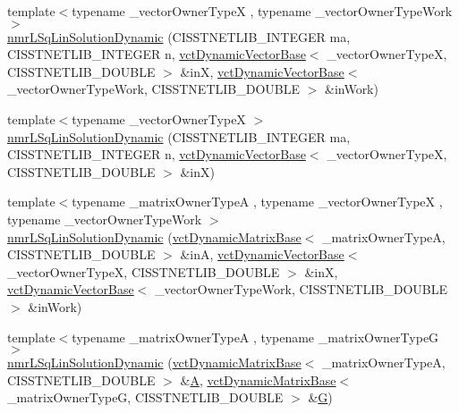 \begin{DoxyCompactItemize}
\item 
{\footnotesize template$<$typename \+\_\+vector\+Owner\+Type\+X , typename \+\_\+vector\+Owner\+Type\+Work $>$ }\\\hyperlink{classnmr_l_sq_lin_solution_dynamic_a722add80abf00679f3a186ca8a1c83c3}{nmr\+L\+Sq\+Lin\+Solution\+Dynamic} (C\+I\+S\+S\+T\+N\+E\+T\+L\+I\+B\+\_\+\+I\+N\+T\+E\+G\+E\+R ma, C\+I\+S\+S\+T\+N\+E\+T\+L\+I\+B\+\_\+\+I\+N\+T\+E\+G\+E\+R n, \hyperlink{classvct_dynamic_vector_base}{vct\+Dynamic\+Vector\+Base}$<$ \+\_\+vector\+Owner\+Type\+X, C\+I\+S\+S\+T\+N\+E\+T\+L\+I\+B\+\_\+\+D\+O\+U\+B\+L\+E $>$ \&in\+X, \hyperlink{classvct_dynamic_vector_base}{vct\+Dynamic\+Vector\+Base}$<$ \+\_\+vector\+Owner\+Type\+Work, C\+I\+S\+S\+T\+N\+E\+T\+L\+I\+B\+\_\+\+D\+O\+U\+B\+L\+E $>$ \&in\+Work)
\item 
{\footnotesize template$<$typename \+\_\+vector\+Owner\+Type\+X $>$ }\\\hyperlink{classnmr_l_sq_lin_solution_dynamic_aa7e2a0b77d8b0d0b4e4b764768648ad3}{nmr\+L\+Sq\+Lin\+Solution\+Dynamic} (C\+I\+S\+S\+T\+N\+E\+T\+L\+I\+B\+\_\+\+I\+N\+T\+E\+G\+E\+R ma, C\+I\+S\+S\+T\+N\+E\+T\+L\+I\+B\+\_\+\+I\+N\+T\+E\+G\+E\+R n, \hyperlink{classvct_dynamic_vector_base}{vct\+Dynamic\+Vector\+Base}$<$ \+\_\+vector\+Owner\+Type\+X, C\+I\+S\+S\+T\+N\+E\+T\+L\+I\+B\+\_\+\+D\+O\+U\+B\+L\+E $>$ \&in\+X)
\item 
{\footnotesize template$<$typename \+\_\+matrix\+Owner\+Type\+A , typename \+\_\+vector\+Owner\+Type\+X , typename \+\_\+vector\+Owner\+Type\+Work $>$ }\\\hyperlink{classnmr_l_sq_lin_solution_dynamic_a02fd55ba7e56df9c56364ff10720f88e}{nmr\+L\+Sq\+Lin\+Solution\+Dynamic} (\hyperlink{classvct_dynamic_matrix_base}{vct\+Dynamic\+Matrix\+Base}$<$ \+\_\+matrix\+Owner\+Type\+A, C\+I\+S\+S\+T\+N\+E\+T\+L\+I\+B\+\_\+\+D\+O\+U\+B\+L\+E $>$ \&in\+A, \hyperlink{classvct_dynamic_vector_base}{vct\+Dynamic\+Vector\+Base}$<$ \+\_\+vector\+Owner\+Type\+X, C\+I\+S\+S\+T\+N\+E\+T\+L\+I\+B\+\_\+\+D\+O\+U\+B\+L\+E $>$ \&in\+X, \hyperlink{classvct_dynamic_vector_base}{vct\+Dynamic\+Vector\+Base}$<$ \+\_\+vector\+Owner\+Type\+Work, C\+I\+S\+S\+T\+N\+E\+T\+L\+I\+B\+\_\+\+D\+O\+U\+B\+L\+E $>$ \&in\+Work)
\item 
{\footnotesize template$<$typename \+\_\+matrix\+Owner\+Type\+A , typename \+\_\+matrix\+Owner\+Type\+G $>$ }\\\hyperlink{classnmr_l_sq_lin_solution_dynamic_a846e92e9d8d04ce4b9ff280c9903f548}{nmr\+L\+Sq\+Lin\+Solution\+Dynamic} (\hyperlink{classvct_dynamic_matrix_base}{vct\+Dynamic\+Matrix\+Base}$<$ \+\_\+matrix\+Owner\+Type\+A, C\+I\+S\+S\+T\+N\+E\+T\+L\+I\+B\+\_\+\+D\+O\+U\+B\+L\+E $>$ \&\hyperlink{classnmr_l_sq_lin_solution_dynamic_aa4a41abac141e2e55dd5cafb59169dfd}{A}, \hyperlink{classvct_dynamic_matrix_base}{vct\+Dynamic\+Matrix\+Base}$<$ \+\_\+matrix\+Owner\+Type\+G, C\+I\+S\+S\+T\+N\+E\+T\+L\+I\+B\+\_\+\+D\+O\+U\+B\+L\+E $>$ \&\hyperlink{classnmr_l_sq_lin_solution_dynamic_a399cb314fb848d36f58c14830bad0c28}{G})

\end{DoxyCompactItemize}
